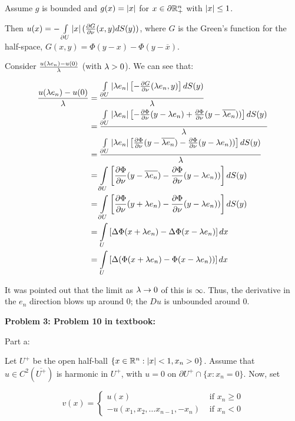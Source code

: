 \documentclass[a4paper,12pt]{article}
\begin{document}
Assume $g$ is bounded and $g(x) = \left\lvert x \right\rvert$ for $x \in \partial \mathbb{R}_+^n$ with $\left\lvert x \right\rvert\leq 1$.

Then $u(x) = -\int\limits_{\partial U} \left\lvert x \right\rvert (\frac{\partial G}{\partial \nu} (x,y) dS(y))$, where $G$ is the Green's function for the half-space, $G(x,y) = \Phi(y-x) - \Phi(y-\overline{x})$.

Consider $\frac{u(\lambda e_n) - u(0)}{\lambda}$ (with $\lambda >0$). We can see that:

\begin{align*}
\frac{u(\lambda e_n) - u(0)}{\lambda} &= \frac{\int\limits_{\partial U} \left\lvert \lambda e_n \right\rvert \left[- \frac{\partial G}{\partial \nu}(\lambda e_n,y)\right]dS(y)}{\lambda}\\
&=\frac{\int\limits_{\partial U} \left\lvert \lambda e_n  \right\rvert \left[- \frac{\partial \Phi}{\partial \nu}(y-\lambda e_n) + \frac{\partial \Phi}{\partial \nu}(y-\overline{\lambda e_n}))\right]dS(y)}{\lambda}\\
&=\frac{\int\limits_{\partial U} \left\lvert \lambda e_n \right\rvert \left[\frac{\partial \Phi}{\partial \nu}(y-\overline{\lambda e_n}) - \frac{\partial \Phi}{\partial \nu}(y-\lambda e_n))\right]dS(y)}{\lambda}\\
&=\int\limits_{\partial U} \left[\frac{\partial \Phi}{\partial \nu}(y-\overline{\lambda e_n}) - \frac{\partial \Phi}{\partial \nu}(y-\lambda e_n))\right]dS(y)\\
&=\int\limits_{\partial U} \left[\frac{\partial \Phi}{\partial \nu}(y+\lambda e_n) - \frac{\partial \Phi}{\partial \nu}(y-\lambda e_n))\right]dS(y)\\
&=\int\limits_{U} \left[\Delta \Phi(x+ \lambda e_n) - \Delta \Phi(x-\lambda e_n) \right]dx\\
&=\int\limits_{U} \left[\Delta (\Phi(x+ \lambda e_n) - \Phi(x-\lambda e_n)) \right]dx\\
\end{align*} %

It was pointed out that the limit as $\lambda \to 0$ of this is $\infty$. Thus, the derivative in the $e_n$ direction blows up around $0$; the $Du$ is unbounded around $0$.

\shunt

{\bf Problem 3: Problem 10 in textbook:}

Part a:

Let $U^+$ be the open half-ball $\{ x \in \mathbb{R}^n : \left\lvert x \right\rvert < 1, x_n > 0\}$. Assume that $u \in C^2(\overline{U^+})$ is harmonic in $U^+$, with $u = 0$ on $\partial U^+ \cap \{x: x_n = 0\}$. Now, set

\begin{displaymath}
v(x) =
   \left\{
     \begin{array}{lr}
       u(x) & \text{ if } x_n \geq 0\\
       -u(x_1,x_2, \ldots x_{n-1}, -x_n) & \text{ if } x_n < 0
     \end{array}
   \right.
\end{displaymath}
\end{document}
